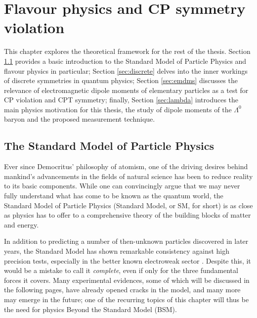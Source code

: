 \chapter{Flavour physics and CP symmetry violation}
\label{cap:flavour_physics}
This chapter explores the theoretical framework for the rest of the thesis.
Section \ref{sec:sm} provides a basic introduction to the Standard Model of Particle Physics and flavour physics in particular;
Section \ref{sec:discrete} delves into the inner workings of discrete symmetries in quantum physics;
Section \ref{sec:emdms} discusses the relevance of electromagnetic dipole moments of elementary particles as a test for CP violation and CPT symmetry;
finally, Section \ref{sec:lambda} introduces the main physics motivation for this thesis, the study of dipole moments of the $\Lambda^0$ baryon and the proposed measurement technique.

\section{The Standard Model of Particle Physics}
\label{sec:sm}
Ever since Democritus' philosophy of atomism, one of the driving desires behind mankind's advancements in the fields of natural science has been to reduce reality to its basic components.
While one can convincingly argue that we may never fully understand what has come to be known as the quantum world, the Standard Model of Particle Physics (Standard Model, or SM, for short) \cite{aitchinson_hey} is as close as physics has to offer to a comprehensive theory of the building blocks of matter and energy.

In addition to predicting a number of then-unknown particles discovered in later years, the Standard Model has shown remarkable consistency against high precision tests, especially in the better known electroweak sector \cite{Erler_2019}.
Despite this, it would be a mistake to call it \textit{complete}, even if only for the three fundamental forces it covers.
Many experimental evidences, some of which will be discussed in the following pages, have already opened cracks in the model, and many more may emerge in the future;
one of the recurring topics of this chapter will thus be the need for physics Beyond the Standard Model (BSM).

